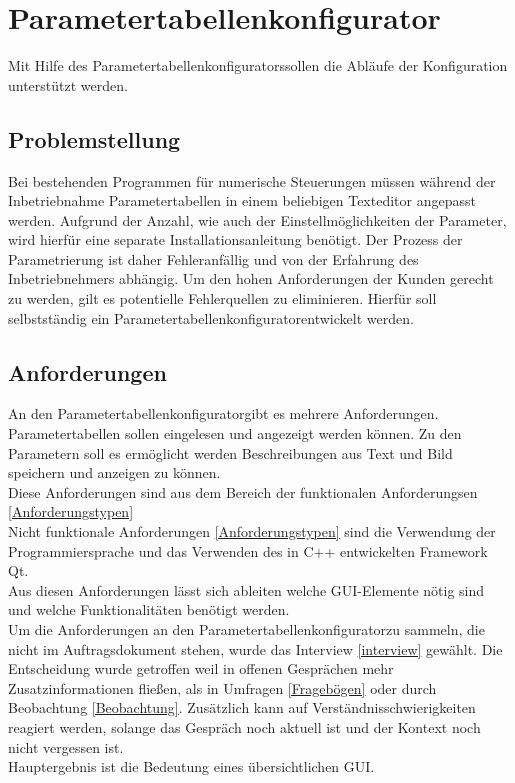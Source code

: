 \documentclass[12pt,a4paper]{article}
\begin{document}
\section{Parametertabellenkonfigurator}
Mit Hilfe des \glqq Parametertabellenkonfigurators\grqq\space sollen die Abläufe der Konfiguration unterstützt werden.
\subsection{Problemstellung}
Bei bestehenden Programmen für numerische Steuerungen müssen während der Inbetriebnahme Parametertabellen in einem beliebigen Texteditor angepasst werden. Aufgrund der Anzahl, wie auch der Einstellmöglichkeiten der Parameter, wird hierfür eine separate Installationsanleitung benötigt. Der Prozess der Parametrierung ist daher Fehleranfällig und von der Erfahrung des Inbetriebnehmers abhängig. Um den hohen Anforderungen der Kunden gerecht zu werden, gilt es potentielle Fehlerquellen zu eliminieren. Hierfür soll selbstständig ein \glqq Parametertabellenkonfigurator\grqq\space entwickelt werden.
\subsection{Anforderungen} 
An den \glqq Parametertabellenkonfigurator\grqq\space gibt es mehrere Anforderungen. \\
Parametertabellen sollen eingelesen und angezeigt werden können. Zu den Parametern soll es ermöglicht werden Beschreibungen aus Text und Bild speichern und anzeigen zu können.\\
Diese Anforderungen sind aus dem Bereich der funktionalen Anforderungsen \ref{Anforderungstypen}\\
Nicht funktionale Anforderungen \ref{Anforderungstypen} sind die Verwendung der Programmiersprache und das Verwenden des in C++ entwickelten Framework Qt.\\
Aus diesen Anforderungen lässt sich ableiten welche GUI-Elemente nötig sind und welche Funktionalitäten benötigt werden.\\
Um die Anforderungen an den \glqq Parametertabellenkonfigurator\grqq\space zu sammeln, die nicht im Auftragsdokument stehen, wurde das Interview \ref{interview} gewählt. Die Entscheidung wurde getroffen weil in offenen Gesprächen mehr Zusatzinformationen fließen, als in Umfragen \ref{Fragebögen} oder durch Beobachtung \ref{Beobachtung}. Zusätzlich kann auf Verständnisschwierigkeiten reagiert werden, solange das Gespräch noch aktuell ist und der Kontext noch nicht vergessen ist.\\
Hauptergebnis ist die Bedeutung eines übersichtlichen GUI.
\end{document}
